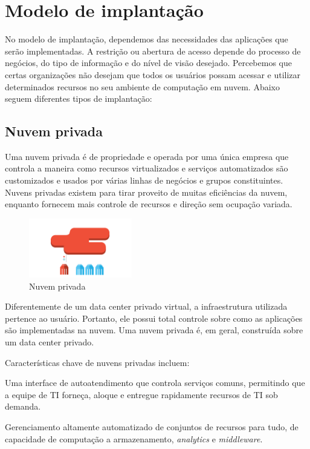 \section{Modelo de implantação}

No modelo de implantação, dependemos das necessidades das aplicações que serão
implementadas. A restrição ou abertura de acesso depende do processo de negócios,
do tipo de informação e do nível de visão desejado. Percebemos que certas
organizações não desejam que todos os usuários possam acessar e utilizar
determinados recursos no seu ambiente de computação em nuvem. Abaixo seguem
diferentes tipos de implantação:

\subsection{Nuvem privada}

Uma nuvem privada é de propriedade e operada por uma única empresa que controla a
maneira como recursos virtualizados e serviços automatizados são customizados e
usados por várias linhas de negócios e grupos constituintes. Nuvens privadas existem
para tirar proveito de muitas eficiências da nuvem, enquanto fornecem mais controle
de recursos e direção sem ocupação variada.

\begin{figure}[ht]
    \centering
    \includegraphics[width=0.4\textwidth]{img/private.png}
    \caption{Nuvem privada}
    \label{img:privatecloud}
\end{figure}

Diferentemente de um data center privado virtual, a infraestrutura utilizada
pertence ao usuário. Portanto, ele possui total controle sobre como as aplicações
são implementadas na nuvem. Uma nuvem privada é, em geral, construída sobre um data
center privado.

Características chave de nuvens privadas incluem:

\begin{itemise}
    \item Uma interface de autoatendimento que controla serviços comuns, permitindo
        que a equipe de TI forneça, aloque e entregue rapidamente recursos de TI
        sob demanda. 
    \item Gerenciamento altamente automatizado de conjuntos de recursos para tudo,
        de capacidade de computação a armazenamento, \emph{analytics} e
        \emph{middleware}.
\end{itemise}

